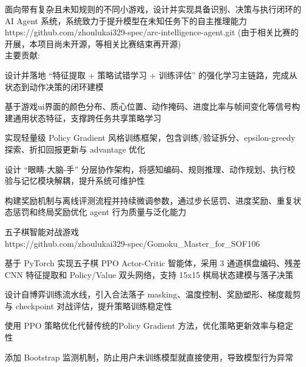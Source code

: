 \documentclass{resume}
\begin{document}
面向带有复杂且未知规则的不同小游戏，设计并实现具备识别、决策与执行闭环的 AI Agent 系统，系统致力于提升模型在未知任务下的自主推理能力\\
https://github.com/zhoulukai329-spec/arc-intelligence-agent.git (由于相关比赛的开展，本项目尚未开源，等相关比赛结束再开源)\\
主要贡献:
\begin{onehalfspacing}
\begin{projectitems}
  \item 设计并落地 ``特征提取 + 策略试错学习 + 训练评估'' 的强化学习主链路，完成从状态到动作决策的闭环建模
  \item 基于游戏ui界面的颜色分布、质心位置、动作掩码、进度比率与帧间变化等信号构建通用状态特征，支撑跨任务共享策略学习
  \item 实现轻量级 Policy Gradient 风格训练框架，包含训练/验证拆分、epsilon-greedy 探索、折扣回报更新与 advantage 优化
  \item 设计 ``眼睛-大脑-手'' 分层协作架构，将感知编码、规则推理、动作规划、执行校验与记忆模块解耦，提升系统可维护性
  \item 构建奖励机制与离线评测流程并持续微调参数，通过步长惩罚、进度奖励、重复状态惩罚和终局奖励优化 agent 行为质量与泛化能力
\end{projectitems}
\end{onehalfspacing}
\projectdivider

\begin{onehalfspacing}
五子棋智能对战游戏 
\\https://github.com/zhoulukai329-spec/Gomoku\_Master\_for\_SOF106
\begin{projectitems}
  \item 基于 PyTorch 实现五子棋 PPO Actor-Critic 智能体，采用 3 通道棋盘编码、残差 CNN 特征提取和 Policy/Value 双头网络，支持 15x15 棋局状态建模与落子决策
  \item 设计自博弈训练流水线，引入合法落子 masking、温度控制、奖励塑形、梯度裁剪与 checkpoint 对战评估，提升策略训练稳定性
  \item 使用 PPO 策略优化代替传统的Policy Gradient 方法，优化策略更新效率与稳定性
  \item 添加 Bootstrap 监测机制，防止用户未训练模型就直接使用，导致模型行为异常
\end{projectitems}
\end{onehalfspacing}
\end{document}
